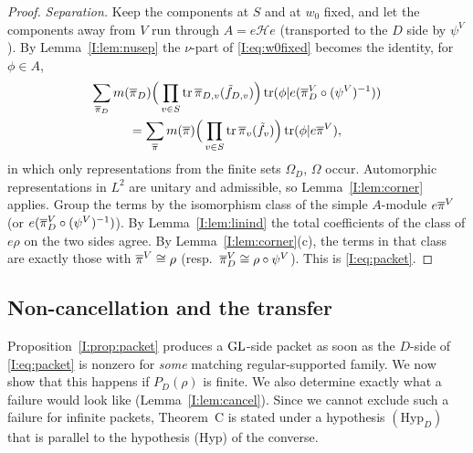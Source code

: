 \begin{proof}
\emph{Separation.} Keep the components at $S$ and at $w_0$ fixed, and let the components away from $V$ run through $A=e\mathcal He$ (transported to the $D$ side by $\psi^V$). By Lemma~\ref{I:lem:nusep} the $\nu$-part of \eqref{I:eq:w0fixed} becomes the identity, for $\phi\in A$,
\begin{multline*} \sum_{\overline{\pi}_D}m(\overline{\pi}_D)\Big(\prod_{v\in S}\operatorname{tr}\overline{\pi}_{D,v}(\tilde f_{D,v})\Big)\operatorname{tr}(\phi|e(\overline{\pi}_D^V\circ(\psi^V)^{-1}))\\=\sum_{\overline{\pi}}m(\overline{\pi})\Big(\prod_{v\in S}\operatorname{tr}\overline{\pi}_v(\tilde f_v)\Big)\operatorname{tr}(\phi|e\overline{\pi}^V), \end{multline*}
in which only representations from the finite sets $\Omega_D$, $\Omega$ occur. Automorphic representations in $L^2$ are unitary and admissible, so Lemma~\ref{I:lem:corner} applies. Group the terms by the isomorphism class of the simple $A$-module $e\overline{\pi}^V$ (or $e(\overline{\pi}_D^V\circ(\psi^V)^{-1})$). By Lemma~\ref{I:lem:linind} the total coefficients of the class of $e\rho$ on the two sides agree. By Lemma~\ref{I:lem:corner}(c), the terms in that class are exactly those with $\overline{\pi}^V\cong\rho$ (resp.\ $\overline{\pi}_D^V\cong\rho\circ\psi^V$). This is \eqref{I:eq:packet}.
\end{proof}

\subsection{Non-cancellation and the transfer}\label{I:subsec:transfer}
Proposition~\ref{I:prop:packet} produces a $\mathrm{GL}$-side packet as soon as the $D$-side of \eqref{I:eq:packet} is nonzero for \emph{some} matching regular-supported family. We now show that this happens if $P_D(\rho)$ is finite. We also determine exactly what a failure would look like (Lemma~\ref{I:lem:cancel}). Since we cannot exclude such a failure for infinite packets, Theorem~C is stated under a hypothesis $(\mathrm{Hyp}_D)$ that is parallel to the hypothesis (Hyp) of the converse.

